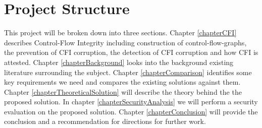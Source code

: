 \section{Project Structure}

This project will be broken down into three sections. Chapter \ref{chapterCFI} describes Control-Flow Integrity including construction of control-flow-graphs, the prevention of CFI corruption, the detection of CFI corruption and how CFI is attested. Chapter \ref{chapterBackground} looks into the background existing literature surrounding the subject. Chapter \ref{chapterComparison} identifies some key requirements we need and compares the existing solutions against them. Chapter \ref{chapterTheoreticalSolution} will describe the theory behind the the proposed solution. In chapter \ref{chapterSecurityAnalysis} we will perform a security evaluation on the proposed solution. Chapter \ref{chapterConclusion} will provide the conclusion and a recommendation for directions for further work.